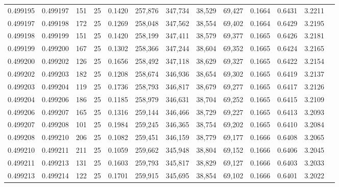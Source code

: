 \begin{tabular}{rrrrrrrrrrrrr}
0.499195 & 0.499197 & 151 &  25 &                                     0.1420 & 257,876 & 347,734 &  38,529 &  69,427 & 0.1664 & 0.6431 & 3.2211 \\
0.499197 & 0.499198 & 172 &  25 &                                     0.1269 & 258,048 & 347,562 &  38,554 &  69,402 & 0.1664 & 0.6429 & 3.2195 \\
0.499198 & 0.499199 & 151 &  25 &                                     0.1420 & 258,199 & 347,411 &  38,579 &  69,377 & 0.1665 & 0.6426 & 3.2181 \\
0.499199 & 0.499200 & 167 &  25 &                                     0.1302 & 258,366 & 347,244 &  38,604 &  69,352 & 0.1665 & 0.6424 & 3.2165 \\
0.499200 & 0.499202 & 126 &  25 &                                     0.1656 & 258,492 & 347,118 &  38,629 &  69,327 & 0.1665 & 0.6422 & 3.2154 \\
0.499202 & 0.499203 & 182 &  25 &                                     0.1208 & 258,674 & 346,936 &  38,654 &  69,302 & 0.1665 & 0.6419 & 3.2137 \\
0.499203 & 0.499204 & 119 &  25 &                                     0.1736 & 258,793 & 346,817 &  38,679 &  69,277 & 0.1665 & 0.6417 & 3.2126 \\
0.499204 & 0.499206 & 186 &  25 &                                     0.1185 & 258,979 & 346,631 &  38,704 &  69,252 & 0.1665 & 0.6415 & 3.2109 \\
0.499206 & 0.499207 & 165 &  25 &                                     0.1316 & 259,144 & 346,466 &  38,729 &  69,227 & 0.1665 & 0.6413 & 3.2093 \\
0.499207 & 0.499208 & 101 &  25 &                                     0.1984 & 259,245 & 346,365 &  38,754 &  69,202 & 0.1665 & 0.6410 & 3.2084 \\
0.499208 & 0.499210 & 206 &  25 &                                     0.1082 & 259,451 & 346,159 &  38,779 &  69,177 & 0.1666 & 0.6408 & 3.2065 \\
0.499210 & 0.499211 & 211 &  25 &                                     0.1059 & 259,662 & 345,948 &  38,804 &  69,152 & 0.1666 & 0.6406 & 3.2045 \\
0.499211 & 0.499213 & 131 &  25 &                                     0.1603 & 259,793 & 345,817 &  38,829 &  69,127 & 0.1666 & 0.6403 & 3.2033 \\
0.499213 & 0.499214 & 122 &  25 &                                     0.1701 & 259,915 & 345,695 &  38,854 &  69,102 & 0.1666 & 0.6401 & 3.2022 \\

\end{tabular}
